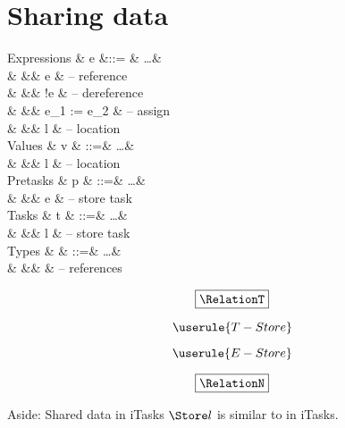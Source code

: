 
\section{Sharing data}

\statefultrue

\begin{grammar}
  Expressions
    & e    &::= & \ldots          & \\
    &      &\mid& \Ref e          & – reference \\
    &      &\mid& !e              & – dereference \\
    &      &\mid& e_1 := e_2      & – assign \\
    &      &\mid& l               & – location \\
  Values
    & v    & ::=& \ldots          & \\
    &      &\mid& l               & – location \\
  Pretasks
    & p    & ::=& \ldots          & \\
    &      &\mid& \Store e        & – store task \\
  Tasks
    & t    & ::=& \ldots          & \\
    &      &\mid& \Store l        & – store task \\
  Types
    & \tau & ::=& \ldots          & \\
    &      &\mid& \Reference \tau & – references \\
\end{grammar}

\begin{equation*}
  \boxed{\RelationT}
\end{equation*}

\begin{equation*}
  \userule{T-Store}
\end{equation*}

\begin{equation*}
  \userule{E-Store}
\end{equation*}

\begin{equation*}
  \boxed{\RelationN}
\end{equation*}

\begin{margintext}{Aside: Shared data in iTasks}
  $\Store l$ is similar to  in iTasks.
\end{margintext}

